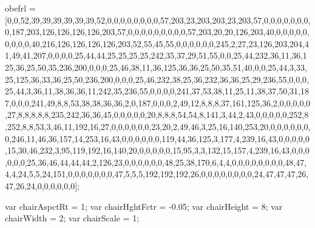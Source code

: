 obefrl = [0,0,52,39,39,39,39,39,39,52,0,0,0,0,0,0,0,0,57,203,23,203,203,23,203,57,0,0,0,0,0,0,0,0,187,203,126,126,126,126,203,57,0,0,0,0,0,0,0,0,0,57,203,20,20,126,203,40,0,0,0,0,0,0,0,0,0,40,216,126,126,126,126,203,52,55,45,55,0,0,0,0,0,0,245,2,27,23,126,203,204,41,49,41,207,0,0,0,0,25,44,44,25,25,25,25,242,35,37,29,51,55,0,0,25,44,232,36,11,36,125,36,25,50,35,236,200,0,0,0,25,46,38,11,36,125,36,36,25,50,35,51,40,0,0,25,44,3,33,25,125,36,33,36,25,50,236,200,0,0,0,25,46,232,38,25,36,232,36,36,25,29,236,55,0,0,0,25,44,3,36,11,38,36,36,11,242,35,236,55,0,0,0,0,241,37,53,38,11,25,11,38,37,50,31,187,0,0,0,241,49,8,8,53,38,38,36,36,2,0,187,0,0,0,2,49,12,8,8,8,37,161,125,36,2,0,0,0,0,0,27,8,8,8,8,8,235,242,36,36,45,0,0,0,0,0,20,8,8,8,54,54,8,141,3,44,2,43,0,0,0,0,0,252,8,252,8,8,53,3,46,11,192,16,27,0,0,0,0,0,0,23,20,2,49,46,3,25,16,140,253,20,0,0,0,0,0,0,0,246,11,46,36,157,14,253,16,43,0,0,0,0,0,0,119,44,36,125,3,177,4,239,16,43,0,0,0,0,0,15,30,46,232,3,95,119,192,16,140,20,0,0,0,0,0,15,95,3,3,132,15,157,4,239,16,43,0,0,0,0,0,0,25,36,46,44,44,44,2,126,23,0,0,0,0,0,0,48,25,38,170,6,4,4,0,0,0,0,0,0,0,0,48,47,4,4,24,5,5,24,151,0,0,0,0,0,0,0,47,5,5,5,192,192,192,26,0,0,0,0,0,0,0,0,24,47,47,47,26,47,26,24,0,0,0,0,0,0];




var chairAspctRt   = 1;
var chairHghtFctr  = -0.05;
var chairHeight    = 8;
var chairWidth     = 2;
var chairScale     = 1;







